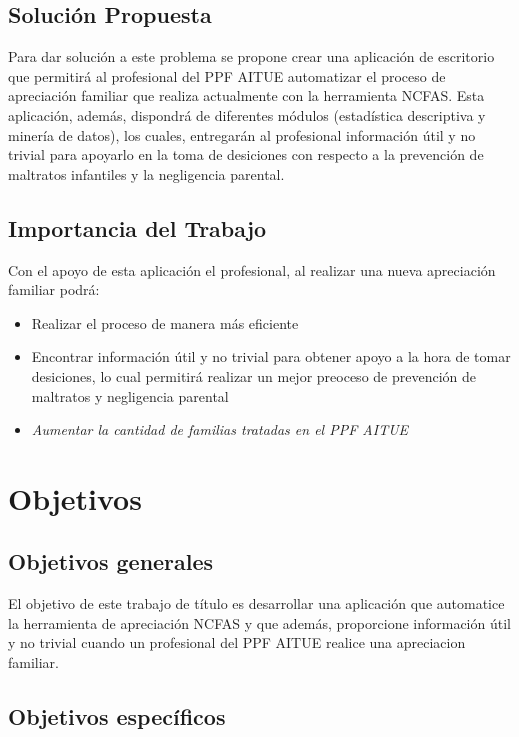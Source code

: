 \documentclass[12pt,letterpaper]{article}
\begin{document}
\subsection{Soluci\'on Propuesta}

Para dar solución a este problema se propone crear una aplicación de escritorio que permitirá al profesional del PPF AITUE automatizar el proceso de apreciación familiar que realiza actualmente con la herramienta NCFAS. Esta aplicación, además, dispondrá de diferentes módulos (estadística descriptiva y minería de datos), los cuales, entregarán al profesional información útil y no trivial para apoyarlo en la toma de desiciones con respecto a la prevención de maltratos infantiles y la negligencia parental. 



\subsection{Importancia del Trabajo}
Con el apoyo de esta aplicación el profesional, al realizar una nueva apreciación familiar podrá:
\begin{itemize}
\item Realizar el proceso de manera más eficiente
\item Encontrar información útil y no trivial para obtener apoyo a la hora de tomar desiciones, lo cual permitirá realizar un mejor preoceso de prevención de maltratos y negligencia parental 
\item \textit{Aumentar la cantidad de familias tratadas en el PPF AITUE}  
\end{itemize}



\section{Objetivos}
\label{obj}

\subsection{Objetivos generales}
El objetivo de este trabajo de título es desarrollar una aplicación que automatice la herramienta de apreciación NCFAS y que además, proporcione información útil y no trivial cuando un profesional del PPF AITUE realice una apreciacion familiar. 


\subsection{Objetivos espec\'ificos}
\end{document}
